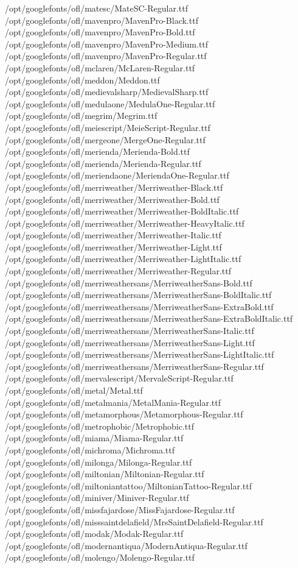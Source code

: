 /opt/googlefonts/ofl/matesc/MateSC-Regular.ttf
/opt/googlefonts/ofl/mavenpro/MavenPro-Black.ttf
/opt/googlefonts/ofl/mavenpro/MavenPro-Bold.ttf
/opt/googlefonts/ofl/mavenpro/MavenPro-Medium.ttf
/opt/googlefonts/ofl/mavenpro/MavenPro-Regular.ttf
/opt/googlefonts/ofl/mclaren/McLaren-Regular.ttf
/opt/googlefonts/ofl/meddon/Meddon.ttf
/opt/googlefonts/ofl/medievalsharp/MedievalSharp.ttf
/opt/googlefonts/ofl/medulaone/MedulaOne-Regular.ttf
/opt/googlefonts/ofl/megrim/Megrim.ttf
/opt/googlefonts/ofl/meiescript/MeieScript-Regular.ttf
/opt/googlefonts/ofl/mergeone/MergeOne-Regular.ttf
/opt/googlefonts/ofl/merienda/Merienda-Bold.ttf
/opt/googlefonts/ofl/merienda/Merienda-Regular.ttf
/opt/googlefonts/ofl/meriendaone/MeriendaOne-Regular.ttf
/opt/googlefonts/ofl/merriweather/Merriweather-Black.ttf
/opt/googlefonts/ofl/merriweather/Merriweather-Bold.ttf
/opt/googlefonts/ofl/merriweather/Merriweather-BoldItalic.ttf
/opt/googlefonts/ofl/merriweather/Merriweather-HeavyItalic.ttf
/opt/googlefonts/ofl/merriweather/Merriweather-Italic.ttf
/opt/googlefonts/ofl/merriweather/Merriweather-Light.ttf
/opt/googlefonts/ofl/merriweather/Merriweather-LightItalic.ttf
/opt/googlefonts/ofl/merriweather/Merriweather-Regular.ttf
/opt/googlefonts/ofl/merriweathersans/MerriweatherSans-Bold.ttf
/opt/googlefonts/ofl/merriweathersans/MerriweatherSans-BoldItalic.ttf
/opt/googlefonts/ofl/merriweathersans/MerriweatherSans-ExtraBold.ttf
/opt/googlefonts/ofl/merriweathersans/MerriweatherSans-ExtraBoldItalic.ttf
/opt/googlefonts/ofl/merriweathersans/MerriweatherSans-Italic.ttf
/opt/googlefonts/ofl/merriweathersans/MerriweatherSans-Light.ttf
/opt/googlefonts/ofl/merriweathersans/MerriweatherSans-LightItalic.ttf
/opt/googlefonts/ofl/merriweathersans/MerriweatherSans-Regular.ttf
/opt/googlefonts/ofl/mervalescript/MervaleScript-Regular.ttf
/opt/googlefonts/ofl/metal/Metal.ttf
/opt/googlefonts/ofl/metalmania/MetalMania-Regular.ttf
/opt/googlefonts/ofl/metamorphous/Metamorphous-Regular.ttf
/opt/googlefonts/ofl/metrophobic/Metrophobic.ttf
/opt/googlefonts/ofl/miama/Miama-Regular.ttf
/opt/googlefonts/ofl/michroma/Michroma.ttf
/opt/googlefonts/ofl/milonga/Milonga-Regular.ttf
/opt/googlefonts/ofl/miltonian/Miltonian-Regular.ttf
/opt/googlefonts/ofl/miltoniantattoo/MiltonianTattoo-Regular.ttf
/opt/googlefonts/ofl/miniver/Miniver-Regular.ttf
/opt/googlefonts/ofl/missfajardose/MissFajardose-Regular.ttf
/opt/googlefonts/ofl/misssaintdelafield/MrsSaintDelafield-Regular.ttf
/opt/googlefonts/ofl/modak/Modak-Regular.ttf
/opt/googlefonts/ofl/modernantiqua/ModernAntiqua-Regular.ttf
/opt/googlefonts/ofl/molengo/Molengo-Regular.ttf
